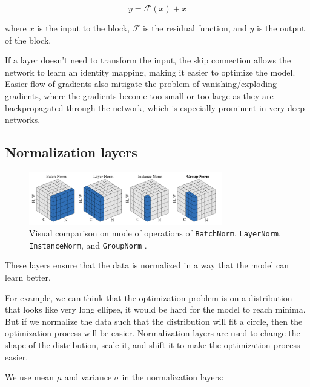 \begin{equation*}
    y = \mathcal{F} (x) + x
\end{equation*}

where $x$ is the input to the block, $\mathcal{F}$ is the residual function, and $y$ is the output of the block.

If a layer doesn't need to transform the input, the skip connection allows the network to learn an identity mapping, making it easier to optimize the model. Easier flow of gradients also mitigate the problem of vanishing/exploding gradients, where the gradients become too small or too large as they are backpropagated through the network, which is especially prominent in very deep networks.







\subsection{Normalization layers}
\label{appendix:blocks_norm}

\begin{figure}
    \centering
    \includegraphics[width=0.75\textwidth]{images/appendix/blocks/norm.png}
    \caption{Visual comparison on mode of operations of \texttt{BatchNorm}, \texttt{LayerNorm}, \texttt{InstanceNorm}, and \texttt{GroupNorm} \cite{wu2018group}.}
    \label{fig:appendix_blocks_norm}
\end{figure}

These layers ensure that the data is normalized in a way that the model can learn better. 

For example, we can think that the optimization problem is on a distribution that looks like very long ellipse, it would be hard for the model to reach minima. But if we normalize the data such that the distribution will fit a circle, then the optimization process will be easier. Normalization layers are used to change the shape of the distribution, scale it, and shift it to make the optimization process easier.

We use mean $\mu$ and variance $\sigma$ in the normalization layers:

